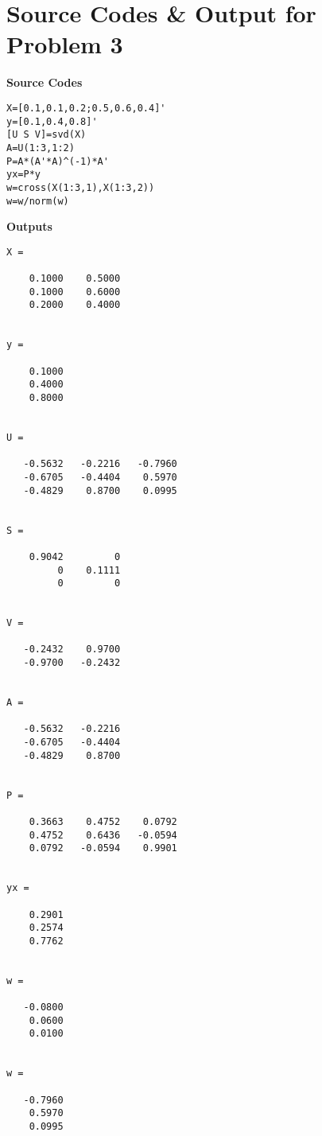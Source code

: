 \documentclass[11pt]{scrartcl}
\begin{document}
\section*{Source Codes \& Output for Problem 3}
\textbf{Source Codes}
\begin{lstlisting}
X=[0.1,0.1,0.2;0.5,0.6,0.4]'
y=[0.1,0.4,0.8]'
[U S V]=svd(X)
A=U(1:3,1:2)
P=A*(A'*A)^(-1)*A'
yx=P*y
w=cross(X(1:3,1),X(1:3,2))
w=w/norm(w)
\end{lstlisting}
\textbf{Outputs}
\begin{lstlisting}
X =

    0.1000    0.5000
    0.1000    0.6000
    0.2000    0.4000


y =

    0.1000
    0.4000
    0.8000


U =

   -0.5632   -0.2216   -0.7960
   -0.6705   -0.4404    0.5970
   -0.4829    0.8700    0.0995


S =

    0.9042         0
         0    0.1111
         0         0


V =

   -0.2432    0.9700
   -0.9700   -0.2432


A =

   -0.5632   -0.2216
   -0.6705   -0.4404
   -0.4829    0.8700


P =

    0.3663    0.4752    0.0792
    0.4752    0.6436   -0.0594
    0.0792   -0.0594    0.9901


yx =

    0.2901
    0.2574
    0.7762


w =

   -0.0800
    0.0600
    0.0100


w =

   -0.7960
    0.5970
    0.0995
\end{lstlisting}
\end{document}

